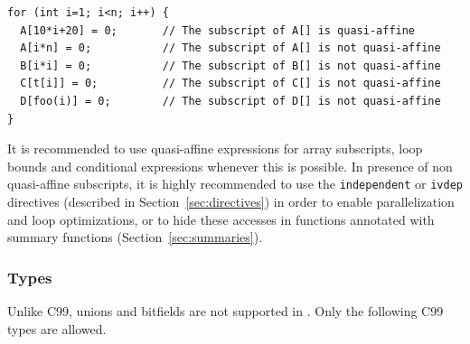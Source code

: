 \begin{lstlisting}[language=pencil]
for (int i=1; i<n; i++) {
  A[10*i+20] = 0;       // The subscript of A[] is quasi-affine
  A[i*n] = 0;           // The subscript of A[] is not quasi-affine
  B[i*i] = 0;           // The subscript of B[] is not quasi-affine
  C[t[i]] = 0;          // The subscript of C[] is not quasi-affine
  D[foo(i)] = 0;        // The subscript of D[] is not quasi-affine
}
\end{lstlisting}

It is recommended to use quasi-affine expressions for array subscripts,
loop bounds and conditional expressions whenever this is possible.
In presence of non quasi-affine subscripts, it is highly recommended
to use the \lstinline!independent! or \lstinline!ivdep! directives 
(described in Section~\ref{sec:directives})
in order to enable parallelization and loop optimizations, or to hide these
accesses in functions annotated with summary functions
(Section~\ref{sec:summaries}).


\subsubsection{Types \label{penciltypes}}

Unlike C99, unions and bitfields are not supported in \pencil.
Only the following C99 types are allowed.

